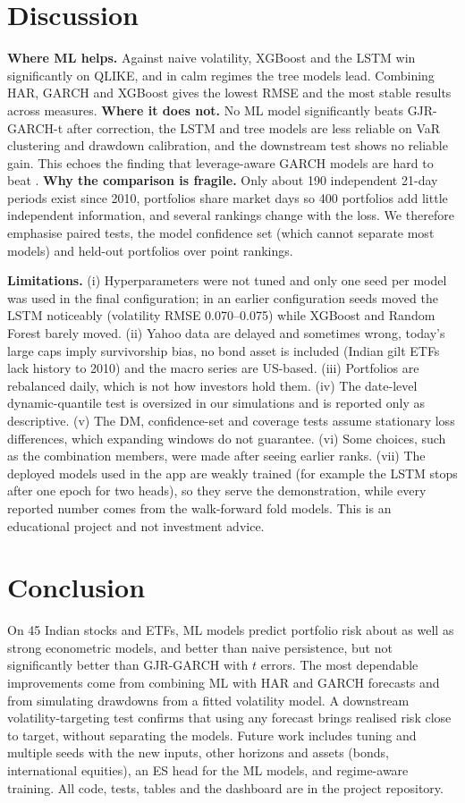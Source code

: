 \documentclass[conference,a4paper]{IEEEtran}
\begin{document}
\section{Discussion}
\textbf{Where ML helps.} Against naive volatility, XGBoost and the LSTM win significantly on QLIKE,
and in calm regimes the tree models lead. Combining HAR, GARCH and XGBoost gives the lowest RMSE and
the most stable results across measures. \textbf{Where it does not.} No ML model significantly
beats GJR-GARCH-t after correction, the LSTM and tree models are less reliable on VaR clustering
and drawdown calibration, and the downstream test shows no reliable gain. This echoes the
finding that leverage-aware GARCH models are hard to beat \cite{hansen2005}. \textbf{Why the comparison is
fragile.} Only about 190 independent 21-day periods exist since 2010, portfolios share market days
so 400 portfolios add little independent information, and several rankings change with the loss.
We therefore emphasise paired tests, the model confidence set (which cannot separate most models)
and held-out portfolios over point rankings.

\textbf{Limitations.} (i) Hyperparameters were not tuned and only one seed per model was used in
the final configuration; in an earlier configuration seeds moved the LSTM noticeably (volatility RMSE
0.070--0.075) while XGBoost and Random Forest barely moved. (ii) Yahoo data are delayed and
sometimes wrong, today's large caps imply survivorship bias, no bond asset is included (Indian gilt
ETFs lack history to 2010) and the macro series are US-based. (iii) Portfolios are rebalanced daily,
which is not how investors hold them. (iv) The date-level dynamic-quantile test is oversized in our
simulations and is reported only as descriptive. (v) The DM, confidence-set and coverage tests
assume stationary loss differences, which expanding windows do not guarantee. (vi) Some choices,
such as the combination members, were made after seeing earlier ranks. (vii) The deployed models
used in the app are weakly trained (for example the LSTM stops after one epoch for two heads), so
they serve the demonstration, while every reported number comes from the walk-forward fold models.
This is an educational project and not investment advice.

\section{Conclusion}
On 45 Indian stocks and ETFs, ML models predict portfolio risk about as well as strong econometric
models, and better than naive persistence, but not significantly better than GJR-GARCH with
$t$ errors. The most dependable improvements come from combining ML with HAR and GARCH forecasts
and from simulating drawdowns from a fitted volatility model. A downstream volatility-targeting test
confirms that using any forecast brings realised risk close to target, without separating the models.
Future work includes tuning and multiple seeds with the new inputs, other horizons and assets (bonds,
international equities), an ES head for the ML models, and regime-aware training. All code, tests,
tables and the dashboard are in the project repository.
\end{document}
